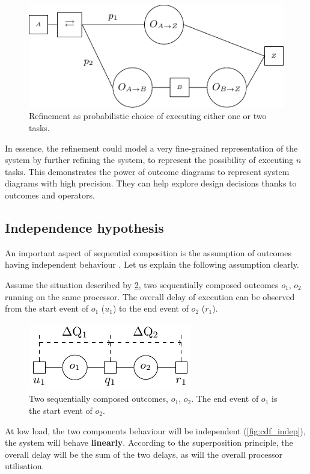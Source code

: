    \begin{figure}[H]
            \begin{center}
                \includegraphics[scale = 1]{tikz/ref_op.pdf}
            \end{center}
            \caption{Refinement as probabilistic choice of executing either one or two tasks.}
            \label{fig:prob_ref}
        \end{figure}
    In essence, the refinement could model a very fine-grained representation of the system by further refining the system, to represent the possibility of executing $n$ tasks. This demonstrates the power of outcome diagrams to represent system diagrams with high precision. They can help explore design decisions thanks to outcomes and operators.

    \subsection{Independence hypothesis} \label{indep_hyp} 
        An important aspect of sequential composition is the assumption of outcomes having independent behaviour \cite{post}. Let us explain the following assumption clearly.

        Assume the situation described by \cref{fig:otc_indep}, two sequentially composed outcomes $o_1$, $o_2$ running on the same processor. The overall delay of execution can be observed from the start event of $o_1$ ($u_1$) to the end event of $o_2$ ($r_1$). 
        \begin{figure}[H]
            \begin{center}
                \includegraphics[scale=1]{tikz/indep.pdf}
            \end{center}
            \caption{Two sequentially composed outcomes, $o_1$, $o_2$. The end event of $o_1$ is the start event of $o_2$.}%
            \label{fig:otc_indep}
        \end{figure} 
        At low load, the two components behaviour will be independent (\cref{fig:cdf_indep}), the system will behave \textbf{linearly}. According to the superposition principle, the overall delay will be the sum of the two delays, as will the overall processor utilisation. \cite{sup-p}
        
